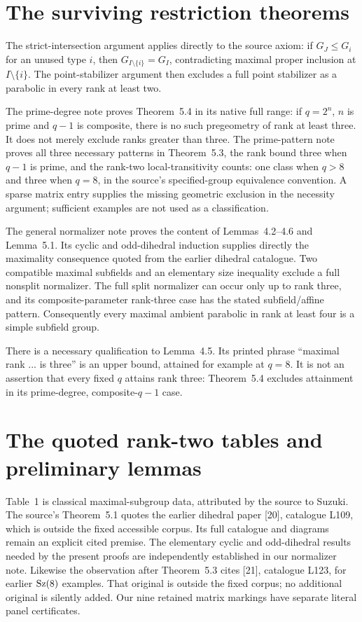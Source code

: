 \documentclass[11pt,a4paper]{article}
\begin{document}
\section{The surviving restriction theorems}
The strict-intersection argument applies directly to the source axiom:
if $G_J\le G_i$ for an unused type $i$, then
$G_{I\setminus\{i\}}=G_I$, contradicting maximal proper inclusion at
$I\setminus\{i\}$. The point-stabilizer argument then excludes a full
point stabilizer as a parabolic in every rank at least two.

The prime-degree note proves Theorem~5.4 in its native full range:
if $q=2^n$, $n$ is prime and $q-1$ is composite, there is no such
pregeometry of rank at least three. It does not merely exclude ranks
greater than three. The prime-pattern note proves all three necessary
patterns in Theorem~5.3, the rank bound three when $q-1$ is prime,
and the rank-two local-transitivity counts: one class when $q>8$ and
three when $q=8$, in the source's specified-group equivalence convention.
A sparse matrix entry supplies the missing geometric exclusion in the
necessity argument; sufficient examples are not used as a classification.

The general normalizer note proves the content of Lemmas~4.2--4.6
and Lemma~5.1. Its cyclic and odd-dihedral induction supplies directly
the maximality consequence quoted from the earlier dihedral catalogue.
Two compatible maximal subfields and an elementary size inequality
exclude a full nonsplit normalizer. The full split normalizer can occur
only up to rank three, and its composite-parameter rank-three case has
the stated subfield/affine pattern. Consequently every maximal ambient
parabolic in rank at least four is a simple subfield group.

There is a necessary qualification to Lemma~4.5. Its printed phrase
``maximal rank ... is three'' is an upper bound, attained for example
at $q=8$. It is not an assertion that every fixed $q$ attains rank
three: Theorem~5.4 excludes attainment in its prime-degree,
composite-$q-1$ case.

\section{The quoted rank-two tables and preliminary lemmas}
Table~1 is classical maximal-subgroup data, attributed by the source
to Suzuki. The source's Theorem~5.1 quotes the earlier dihedral paper
[20], catalogue L109, which is outside the fixed accessible corpus.
Its full catalogue and diagrams remain an explicit cited premise.
The elementary cyclic and odd-dihedral results needed by the present
proofs are independently established in our normalizer note.
Likewise the observation after Theorem~5.3 cites [21], catalogue L123,
for earlier $\operatorname{Sz}(8)$ examples. That original is outside the fixed
corpus; no additional original is silently added. Our nine retained
matrix markings have separate literal panel certificates.
\end{document}
